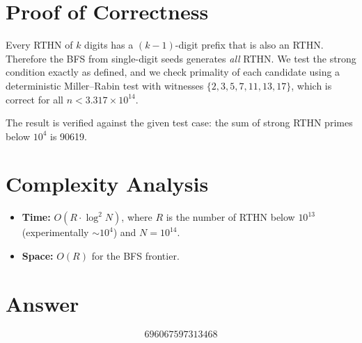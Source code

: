 \documentclass[11pt]{article}
\begin{document}
\section{Proof of Correctness}
Every RTHN of $k$ digits has a $(k{-}1)$-digit prefix that is also an RTHN. Therefore the BFS from single-digit seeds generates \emph{all} RTHN. We test the strong condition exactly as defined, and we check primality of each candidate using a deterministic Miller--Rabin test with witnesses $\{2,3,5,7,11,13,17\}$, which is correct for all $n < 3.317 \times 10^{14}$.

The result is verified against the given test case: the sum of strong RTHN primes below $10^4$ is 90619.

\section{Complexity Analysis}
\begin{itemize}
    \item \textbf{Time:} $O(R \cdot \log^2 N)$, where $R$ is the number of RTHN below $10^{13}$ (experimentally $\sim\!10^4$) and $N = 10^{14}$.
    \item \textbf{Space:} $O(R)$ for the BFS frontier.
\end{itemize}

\section{Answer}

\[
\boxed{696067597313468}
\]
\end{document}
